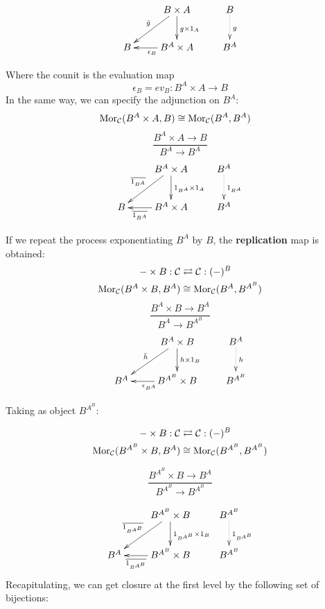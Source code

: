 \documentclass[aps,twocolumn]{revtex4-1}
\begin{document}
			$$
			\xymatrix{
			& B \times A \ar[d]^{g \times 1_A} \ar[dl]_{\bar{g}} & B \ar@{.>}[d]^{g}\\
			B & B^A \times A \ar[l]^{\epsilon_B} & B^A}
			$$
	
Where the counit is the evaluation map
		$$
			\epsilon_B = ev_B \colon B^A \times A \longrightarrow B
		$$
In the same way, we can specify the adjunction on $B^A$:
\begin{align*}
\mathop{\rm Mor}\nolimits_{\mathcal{C}}(B^A \times A, B) & \cong  \mathop{\rm Mor}\nolimits_{\mathcal{C}}(B^A, B^{A})
\end{align*}
	$$
			\frac{B^A \times A \longrightarrow B}{B^A \longrightarrow B^{A}}
		$$
				$$
			\xymatrix{
			& B^A \times A \ar[d]^{1_{B^A} \times 1_A} \ar[dl]_{\overline{1_{B^A}}} & B^A \ar@{.>}[d]^{1_{B^A}}\\
			B & B^A \times A \ar[l]^-{\overline{1_{B^A}}} & B^A}
			$$

If we repeat the process exponentiating $B^A$ by $B$, the \textbf{replication} map is obtained:	
\begin{align*}
- \times B: \mathcal{C} & \rightleftarrows \mathcal{C}: (-)^B\\
\mathop{\rm Mor}\nolimits_{\mathcal{C}}(B^A \times B, B^A) & \cong  \mathop{\rm Mor}\nolimits_{\mathcal{C}}(B^A, B^{A^B})
\end{align*}
	$$
			\frac{B^A \times B \longrightarrow B^A}{B^A \longrightarrow B^{A^B}}
		$$
			$$ \xymatrix{
			& B^A \times B \ar[d]^-{h \times 1_B} \ar[dl]_{\bar{h}} & B^A \ar@{.>}[d]^-{h}\\
			B^A & B^{A^B} \times B \ar[l]^{\epsilon_{B^A}} & B^{A^B}}
			$$
		
Taking as object $B^{A^B}$:

\begin{align*}
- \times B: \mathcal{C} & \rightleftarrows \mathcal{C}: (-)^B\\
\mathop{\rm Mor}\nolimits_{\mathcal{C}}(B^{A^B} \times B, B^A) & \cong  \mathop{\rm Mor}\nolimits_{\mathcal{C}}(B^{A^B}, B^{A^B})
\end{align*}

		$$
			\frac{B^{A^B} \times B \longrightarrow B^A}{B^{A^B} \longrightarrow B^{A^B}}
		$$

			$$
			\xymatrix{
			& B^{A^B} \times B \ar[d]^{1_{B^{A^B}} \times 1_B} \ar[dl]_{\overline{1_{B^{A^B}}}} & B^{A^B} \ar@{.>}[d]^{1_{B^{A^B}}}\\
			B^A & B^{A^B} \times B \ar[l]^-{\overline{1_{B^{A^B}}}} & B^{A^B}}
			$$
Recapitulating, we can get closure at the first level by the following set of bijections:
				\begin{prooftree}
											
				\end{prooftree}
						
\end{document}
